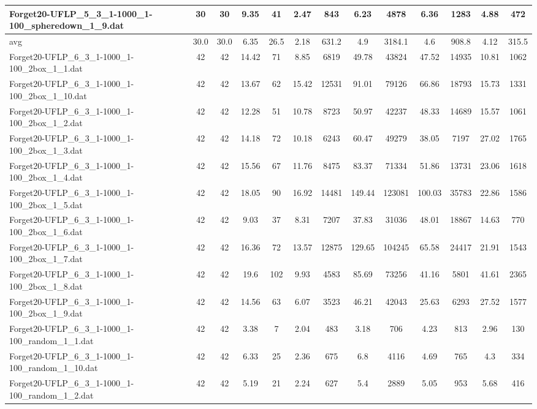 \begin{table}[!ht]
{\begin{tabular}{lcccccccccccc}
Forget20-UFLP\_5\_3\_1-1000\_1-100\_spheredown\_1\_9.dat & 30 & 30 & 9.35 & 41 & 2.47 & 843 & 6.23 & 4878 & 6.36 & 1283 & 4.88 & 472 \\
\hline avg & 30.0 & 30.0 & 6.35& 26.5 & 2.18& 631.2 & 4.9& 3184.1 & 4.6& 908.8 & 4.12& 315.5\\ \hline
Forget20-UFLP\_6\_3\_1-1000\_1-100\_2box\_1\_1.dat & 42 & 42 & 14.42 & 71 & 8.85 & 6819 & 49.78 & 43824 & 47.52 & 14935 & 10.81 & 1062 \\
Forget20-UFLP\_6\_3\_1-1000\_1-100\_2box\_1\_10.dat & 42 & 42 & 13.67 & 62 & 15.42 & 12531 & 91.01 & 79126 & 66.86 & 18793 & 15.73 & 1331 \\
Forget20-UFLP\_6\_3\_1-1000\_1-100\_2box\_1\_2.dat & 42 & 42 & 12.28 & 51 & 10.78 & 8723 & 50.97 & 42237 & 48.33 & 14689 & 15.57 & 1061 \\
Forget20-UFLP\_6\_3\_1-1000\_1-100\_2box\_1\_3.dat & 42 & 42 & 14.18 & 72 & 10.18 & 6243 & 60.47 & 49279 & 38.05 & 7197 & 27.02 & 1765 \\
Forget20-UFLP\_6\_3\_1-1000\_1-100\_2box\_1\_4.dat & 42 & 42 & 15.56 & 67 & 11.76 & 8475 & 83.37 & 71334 & 51.86 & 13731 & 23.06 & 1618 \\
Forget20-UFLP\_6\_3\_1-1000\_1-100\_2box\_1\_5.dat & 42 & 42 & 18.05 & 90 & 16.92 & 14481 & 149.44 & 123081 & 100.03 & 35783 & 22.86 & 1586 \\
Forget20-UFLP\_6\_3\_1-1000\_1-100\_2box\_1\_6.dat & 42 & 42 & 9.03 & 37 & 8.31 & 7207 & 37.83 & 31036 & 48.01 & 18867 & 14.63 & 770 \\
Forget20-UFLP\_6\_3\_1-1000\_1-100\_2box\_1\_7.dat & 42 & 42 & 16.36 & 72 & 13.57 & 12875 & 129.65 & 104245 & 65.58 & 24417 & 21.91 & 1543 \\
Forget20-UFLP\_6\_3\_1-1000\_1-100\_2box\_1\_8.dat & 42 & 42 & 19.6 & 102 & 9.93 & 4583 & 85.69 & 73256 & 41.16 & 5801 & 41.61 & 2365 \\
Forget20-UFLP\_6\_3\_1-1000\_1-100\_2box\_1\_9.dat & 42 & 42 & 14.56 & 63 & 6.07 & 3523 & 46.21 & 42043 & 25.63 & 6293 & 27.52 & 1577 \\
Forget20-UFLP\_6\_3\_1-1000\_1-100\_random\_1\_1.dat & 42 & 42 & 3.38 & 7 & 2.04 & 483 & 3.18 & 706 & 4.23 & 813 & 2.96 & 130 \\
Forget20-UFLP\_6\_3\_1-1000\_1-100\_random\_1\_10.dat & 42 & 42 & 6.33 & 25 & 2.36 & 675 & 6.8 & 4116 & 4.69 & 765 & 4.3 & 334 \\
Forget20-UFLP\_6\_3\_1-1000\_1-100\_random\_1\_2.dat & 42 & 42 & 5.19 & 21 & 2.24 & 627 & 5.4 & 2889 & 5.05 & 953 & 5.68 & 416 \\

\end{tabular}}
\end{table}
